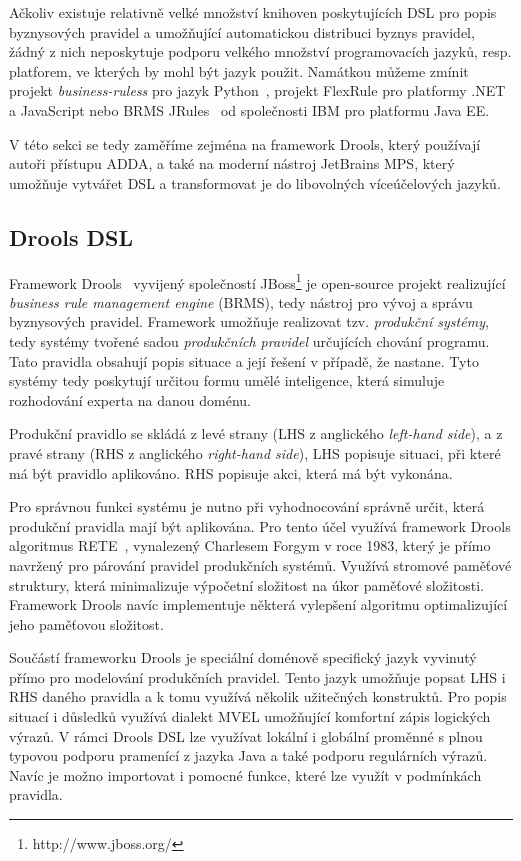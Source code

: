 Ačkoliv existuje relativně velké množství knihoven poskytujících
\gls{DSL} pro popis byznysových pravidel a umožňující automatickou
distribuci byznys pravidel, žádný z nich neposkytuje podporu velkého
množství programovacích jazyků, resp. platforem, ve kterých by mohl
být jazyk použit. Namátkou můžeme zmínit projekt \textit{business-ruless}
pro jazyk Python~\cite{businessrulespython}, projekt FlexRule pro platformy .NET a
JavaScript nebo \gls{BRMS} JRules~\cite{jrules} od společnosti IBM pro
platformu \gls{Java EE}.

V této sekci se tedy zaměříme zejména na framework Drools, který
používají autoři přístupu \gls{ADDA}, a také na moderní nástroj
JetBrains MPS, který umožňuje vytvářet \gls{DSL} a transformovat je
do libovolných víceúčelových jazyků.

\subsection{Drools DSL}

Framework Drools~\cite{drools} vyvijený společností JBoss\footnote{http://www.jboss.org/}
je open-source projekt realizující \textit{business rule management engine} (\gls{BRMS}),
tedy nástroj pro vývoj a správu byznysových pravidel. Framework umožňuje realizovat
tzv. \textit{produkční systémy}, tedy systémy tvořené sadou \textit{produkčních pravidel}
určujících chování programu. Tato pravidla obsahují popis situace a její řešení v případě,
že nastane. Tyto systémy tedy poskytují určitou formu umělé inteligence, která simuluje
rozhodování experta na danou doménu.

Produkční pravidlo se skládá z levé strany (\gls{LHS} z anglického \textit{left-hand side}),
a z pravé strany (\gls{RHS} z anglického \textit{right-hand side}),
\gls{LHS} popisuje situaci, při které má být pravidlo aplikováno. \gls{RHS} popisuje akci,
která má být vykonána.

Pro správnou funkci systému je nutno při vyhodnocování správně určit, která produkční pravidla
mají být aplikována. Pro tento účel využívá framework Drools algoritmus RETE~\cite{forgy1988rete},
vynalezený Charlesem Forgym v roce 1983, který je přímo navržený pro párování pravidel produkčních systémů.
Využívá stromové paměťové struktury, která minimalizuje výpočetní složitost na úkor paměťové složitosti. Framework
Drools navíc implementuje některá vylepšení algoritmu optimalizující jeho paměťovou složitost.

Součástí frameworku Drools je speciální doménově specifický jazyk vyvinutý přímo
pro modelování produkčních pravidel. Tento jazyk umožňuje popsat \gls{LHS} i \gls{RHS}
daného pravidla a k tomu využívá několik užitečných konstruktů. Pro popis situací i důsledků
využívá dialekt MVEL umožňující komfortní zápis logických výrazů. V rámci Drools \gls{DSL}
lze využívat lokální i globální proměnné s plnou typovou podporu pramenící z jazyka Java a také
podporu regulárních výrazů. Navíc je možno importovat i pomocné funkce, které lze
využít v podmínkách pravidla.

